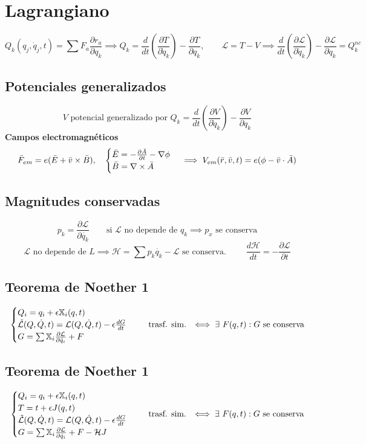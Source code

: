 \documentclass[leqno]{article}
\newcommand{\1}{\tikz[baseline=(char.base)]{
            \node[shape=circle,draw,inner sep=1pt] (char) {1};}}
\newcommand{\2}{\tikz[baseline=(char.base)]{
            \node[shape=circle,draw,inner sep=1pt] (char) {2};}}
\newcommand{\X}{\mathbb{X}}
\newcommand{\dt}{\frac{d}{dt}}
\renewcommand{\L}{\mathcal{L}}
\renewcommand{\H}{\mathcal{H}}
\begin{document}
\section{Lagrangiano}
$$
Q_k(q_j, \dot q_j, t) = \sum F_a \frac{\partial r_a}{\partial q_k} \implies Q_k = \dt\left(\frac{\partial T}{\partial \dot q_k}\right) -\frac{\partial T}{\partial q_k}, \qquad \L = T-V \implies \dt\left(\frac{\partial \L}{\partial \dot q_k}\right) - \frac{\partial \L}{\partial q_k} = Q_k^{nc}
$$
\subsection{Potenciales generalizados}
$$
V \text{ potencial generalizado por } Q_k = \frac{d}{dt}\left( \frac{\partial V}{\partial \dot{q}_k} \right) - \frac{\partial V}{\partial q_k}
$$
\textbf{Campos electromagnéticos}\\
$$
\Bar{F}_{em} = e(\Bar{E}+ \Bar{v}\times \Bar{B}), \quad \begin{cases}
\Bar{E} = -\frac{\partial \Bar{A}}{\partial t} - \nabla \phi \\
\Bar{B} = \nabla \times \Bar{A}
\end{cases} \implies V_{em}(\Bar{r}, \Bar{v}, t) = e(\phi - \Bar{v}\cdot \Bar{A})
$$

\subsection{Magnitudes conservadas}
$$
p_k = \frac{\partial \L}{\partial \dot{q_k}} \qquad \text{si } \L \text{ no depende de } q_k \implies p_x \text{ se conserva} 
$$
$$
\L \text{ no depende de } L \implies \H = \sum p_k\dot{q_k} - \L \text{ se conserva. } \qquad \frac{d \H}{dt}  = -\frac{\partial \L}{\partial t}
$$
\subsection{Teorema de Noether 1}
$$
\begin{cases}
Q_i = q_i + \epsilon \X_i(q, t) \\
\Tilde{\L}(Q, \dot{Q}, t) = \L(Q, \dot{Q}, t) - \epsilon \frac{dG}{dt} \\
G = \sum \X_i \frac{\partial \L}{\partial \dot{q}_i} + F
\end{cases} \quad
\text{ trasf. sim. } \iff \exists \ F(q, t) : G \text{ se conserva}
$$
\subsection{Teorema de Noether 1}
$$
\begin{cases}
Q_i = q_i + \epsilon \X_i(q, t) \\
T = t + \epsilon J(q, t) \\
\Tilde{\L}(Q, \dot{Q}, t) = \L(Q, \dot{Q}, t) - \epsilon \frac{dG}{dt} \\
G = \sum \X_i \frac{\partial \L}{\partial \dot{q}_i} + F - \H J
\end{cases} \quad
\text{ trasf. sim. } \iff \exists \ F(q, t) : G \text{ se conserva}
$$
 
\end{document}
